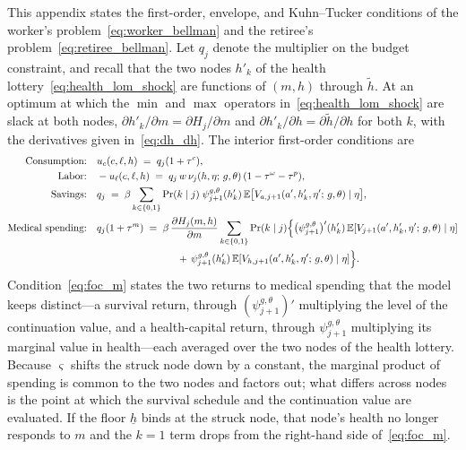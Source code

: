 \documentclass[12pt,a4paper]{article}
\newcommand{\E}{\mathbb{E}}
\begin{document}
\begin{appendices}
This appendix states the first-order, envelope, and Kuhn--Tucker conditions of the worker's problem~\eqref{eq:worker_bellman} and the retiree's problem~\eqref{eq:retiree_bellman}. Let $q_j$ denote the multiplier on the budget constraint, and recall that the two nodes $h'_k$ of the health lottery~\eqref{eq:health_lom_shock} are functions of $(m, h)$ through $\tilde h$. At an optimum at which the $\min$ and $\max$ operators in~\eqref{eq:health_lom_shock} are slack at both nodes, $\partial h'_k / \partial m = \partial H_j / \partial m$ and $\partial h'_k / \partial h = \partial \tilde h / \partial h$ for both $k$, with the derivatives given in~\eqref{eq:dh_dh}. The interior first-order conditions are
\begin{align}
\text{Consumption:} \quad & u_c(c, \ell, h) \;=\; q_j (1 + \tau^c), \label{eq:foc_c}\\
\text{Labor:} \quad & -u_\ell(c, \ell, h) \;=\; q_j\, w\, \nu_j(h, \eta;\, g, \theta)\,(1-\tau^\omega-\tau^p), \label{eq:foc_l}\\
\text{Savings:} \quad & q_j \;=\; \beta \sum_{k \in \{0,1\}} \Pr(k \mid j)\; \psi_{j+1}^{g,\theta}(h'_k)\, \E\bigl[V_{a, j+1}(a', h'_k, \eta';\, g, \theta) \mid \eta\bigr], \label{eq:foc_a}\\
\text{Medical spending:} \quad & q_j (1 + \tau^m)
\;=\; \beta\, \frac{\partial H_j(m,h)}{\partial m} \sum_{k \in \{0,1\}} \Pr(k \mid j)\Bigl\{
\bigl(\psi_{j+1}^{g,\theta}\bigr)'(h'_k)\, \E[V_{j+1}(a', h'_k, \eta';\, g, \theta) \mid \eta] \notag\\
&\qquad\qquad\qquad\qquad +\, \psi_{j+1}^{g,\theta}(h'_k)\, \E[V_{h, j+1}(a', h'_k, \eta';\, g, \theta) \mid \eta]
\Bigr\}. \label{eq:foc_m}
\end{align}
Condition~\eqref{eq:foc_m} states the two returns to medical spending that the model keeps distinct---a survival return, through $(\psi^{g,\theta}_{j+1})'$ multiplying the level of the continuation value, and a health-capital return, through $\psi^{g,\theta}_{j+1}$ multiplying its marginal value in health---each averaged over the two nodes of the health lottery. Because $\varsigma$ shifts the struck node down by a constant, the marginal product of spending is common to the two nodes and factors out; what differs across nodes is the point at which the survival schedule and the continuation value are evaluated. If the floor $\underline h$ binds at the struck node, that node's health no longer responds to $m$ and the $k=1$ term drops from the right-hand side of~\eqref{eq:foc_m}.


\end{appendices}
\end{document}
